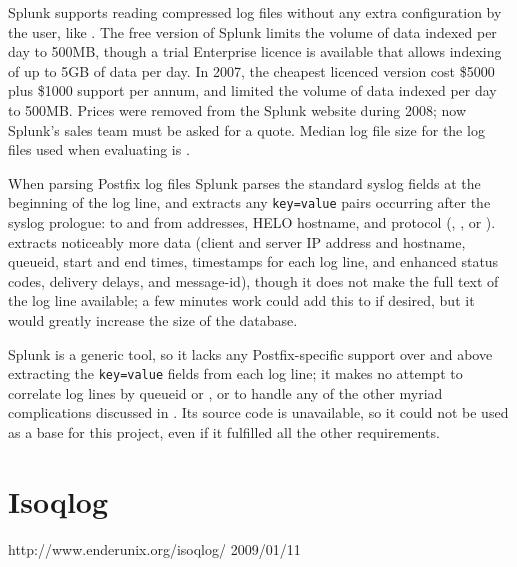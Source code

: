 Splunk supports reading compressed log files without any extra
configuration by the user, like \parsername{}.  The free version of Splunk
limits the volume of data indexed per day to 500MB, though a trial
Enterprise licence is available that allows indexing of up to 5GB of data
per day.  In 2007, the cheapest licenced version cost \$5000 plus \$1000
support per annum, and limited the volume of data indexed per day to
500MB\@.  Prices were removed from the Splunk website during 2008; now
Splunk's sales team must be asked for a quote.  Median log file size for
the log files used when evaluating \parsername{} is
.

When parsing Postfix log files Splunk parses the standard
syslog fields at the beginning of the log line, and extracts
any \texttt{key=value} pairs occurring after the syslog prologue: to and
from addresses, HELO hostname, and protocol (,
, or ).  \parsername{} extracts noticeably
more data (client and server IP address and hostname, queueid, start and
end times, timestamps for each log line,  and enhanced status
codes, delivery delays, and message-id), though it does not make the full
text of the log line available; a few minutes work could add this to
\parsername{} if desired, but it would greatly increase the size of the
database.

Splunk is a generic tool, so it lacks any Postfix-specific support over and
above extracting the \texttt{key=value} fields from each log line; it makes
no attempt to correlate log lines by queueid or , or to handle
any of the other myriad complications discussed in
.  Its source code is unavailable, so it could
not be used as a base for this project, even if it fulfilled all the other
requirements.

\section{Isoqlog}

{http://www.enderunix.org/isoqlog/}
{2009/01/11}


